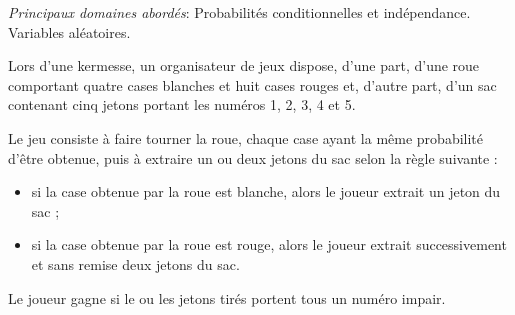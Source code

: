 \medskip

\emph{Principaux domaines abordés}: Probabilités conditionnelles et indépendance. Variables aléatoires.

\medskip

Lors d'une kermesse, un organisateur de jeux dispose, d'une part, d'une roue comportant quatre cases blanches et huit cases rouges et, d'autre part, d'un sac contenant cinq jetons portant les numéros 1, 2, 3, 4 et 5.

Le jeu consiste à faire tourner la roue, chaque case ayant la même probabilité d'être obtenue, puis à extraire un ou deux jetons du sac selon la règle suivante :

\setlength\parindent{1cm}
\begin{itemize}
\item[$\bullet~~$] si la case obtenue par la roue est blanche, alors le joueur extrait un jeton du sac ;
\item[$\bullet~~$] si la case obtenue par la roue est rouge, alors le joueur extrait successivement et sans remise deux jetons du sac.
\end{itemize}
\setlength\parindent{0cm}

Le joueur gagne si le ou les jetons tirés portent tous un numéro impair.

\medskip

